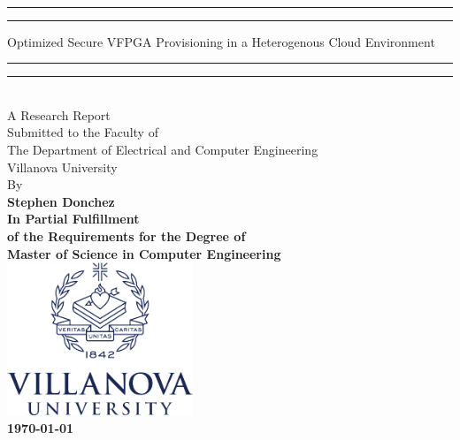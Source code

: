\begin{titlepage}
    \begingroup

\centering
~
\sffamily\bfseries\fontsize{24}{31.2}\selectfont
\rule{\textwidth}{1.6pt}\vspace*{-\baselineskip}\vspace*{2pt} %
	\rule{\textwidth}{0.4pt} %
	
	\vspace{0.5\baselineskip} %
	Optimized Secure VFPGA Provisioning in a Heterogenous Cloud Environment

\rule{\textwidth}{1.6pt}\vspace*{-\baselineskip}\vspace*{2pt} %
	\rule{\textwidth}{0.4pt} %
\\[0.4in]
\normalfont\large
A Research Report\\
Submitted to the Faculty of\\
The Department of Electrical and Computer Engineering\\
 Villanova University\\
 \vspace{.2in}
 By
\\
\vspace{0.25in}
\sffamily\bfseries\Large
Stephen Donchez
\\[0.4in]
\normalfont\normalsize
In Partial Fulfillment\\ of the Requirements for the Degree of\\

Master of Science in Computer Engineering
\\[1.5em]
\includegraphics[height=1.8in]{vulogo}\\
[4em]
\today
\par
\endgroup

\end{titlepage}